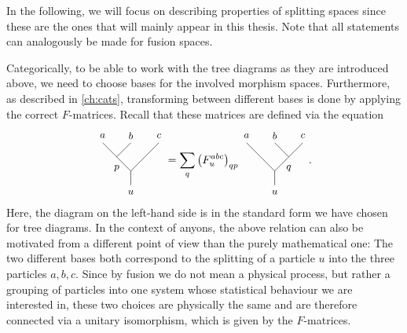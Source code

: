 In the following, we will focus on describing properties of splitting spaces since these are the ones that will mainly appear in this thesis. Note that all statements can analogously be made for fusion spaces.

Categorically, to be able to work with the tree diagrams as they are introduced above, we need to choose bases for the involved morphism spaces. Furthermore, as described in \cref{ch:cats}, transforming between different bases is done by applying the correct $F$-matrices. Recall that these matrices are defined via the equation
	\begin{equation}
		\begin{tikzpicture}[baseline=(current bounding box.center),yscale=0.9,xscale=0.9]
			\draw (0,0.5) -- (0,1);
			\draw (0,1) -- (-0.5,1.5);
			\draw (-0.5,1.5) -- (-1,2);
			\draw (-0.5,1.5) -- (0,2);
			\draw (0,1) -- (0.5,1.5);
			\draw (0.5,1.5) -- (1,2);
			\node at (0,0.25) {\small $u$};
			\node at (-1,2.25) {\small $a$};
			\node at (0,2.25) {\small $b$};
			\node at (1,2.25) {\small $c$};
			\node at (-0.5,1.1) {\small $p$};
		\end{tikzpicture}=\sum_q \left(F_u^{abc}\right)_{qp}
		\begin{tikzpicture}[baseline=(current bounding box.center),yscale=0.9,xscale=0.9]
			\draw (0,0.5) -- (0,1);
			\draw (0,1) -- (-0.5,1.5);
			\draw (-0.5,1.5) -- (-1,2);
			\draw (0.5,1.5) -- (0,2);
			\draw (0,1) -- (0.5,1.5);
			\draw (0.5,1.5) -- (1,2);
			\node at (0,0.25) {\small $u$};
			\node at (-1,2.25) {\small $a$};
			\node at (0,2.25) {\small $b$};
			\node at (1,2.25) {\small $c$};
			\node at (0.5,1.1) {\small $q$};
		\end{tikzpicture}.
	\end{equation}
Here, the diagram on the left-hand side is in the standard form we have chosen for tree diagrams. In the context of anyons, the above relation can also be motivated from a different point of view than the purely mathematical one: The two different bases both correspond to the splitting of a particle $u$ into the three particles $a,b,c$. Since by fusion we do not mean a physical process, but rather a grouping of particles into one system whose statistical behaviour we are interested in, these two choices are physically the same and are therefore connected via a unitary isomorphism, which is given by the $F$-matrices. 

